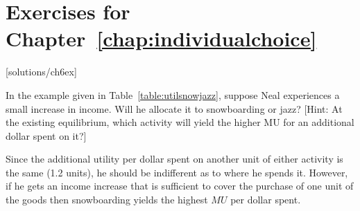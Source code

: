 \newpage
\section*{Exercises for Chapter~\ref{chap:individualchoice}}

\begin{enumialphparenastyle}

[solutions/ch6ex]

\begin{ex}\label{ex:ch6ex1}
In the example given in Table~\ref{table:utilsnowjazz}, suppose Neal experiences a small increase in income. Will he allocate it to snowboarding or jazz? [Hint: At the existing equilibrium, which activity will yield the higher MU for an additional dollar spent on it?]
\begin{sol}
	Since the additional utility per dollar spent on another unit of either activity is the same (1.2 units), he should be indifferent as to where he	spends it. However, if he gets an income increase that is sufficient to cover the purchase of one unit of the goods then snowboarding yields the highest $MU$ per dollar spent.
	
\end{sol}
\end{ex}


\end{enumialphparenastyle}
